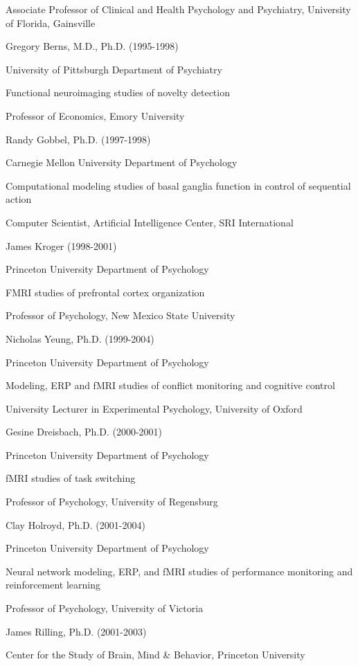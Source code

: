 \documentclass[10 pt]{article}
\begin{document}
Associate Professor of Clinical and Health Psychology and Psychiatry, University of Florida, Gainsville
    \medskip

Gregory Berns, M.D., Ph.D. (1995-1998)

University of Pittsburgh Department of Psychiatry

Functional neuroimaging studies of novelty detection

Professor of Economics, Emory University
    \medskip

Randy Gobbel, Ph.D. (1997-1998)

Carnegie Mellon University Department of Psychology

Computational modeling studies of basal ganglia function in control of sequential action

Computer Scientist, Artificial Intelligence Center, SRI International
    \medskip

James Kroger (1998-2001)

Princeton University Department of Psychology

FMRI studies of prefrontal cortex organization

Professor of Psychology, New Mexico State University
    \medskip

Nicholas Yeung, Ph.D. (1999-2004)

Princeton University Department of Psychology

Modeling, ERP and fMRI studies of conflict monitoring and cognitive control

University Lecturer in Experimental Psychology, University of Oxford
    \medskip

Gesine Dreisbach, Ph.D. (2000-2001)

Princeton University Department of Psychology

fMRI studies of task switching

Professor of Psychology, University of Regensburg
    \medskip

Clay Holroyd, Ph.D. (2001-2004)

Princeton University Department of Psychology

Neural network modeling, ERP, and fMRI studies of performance monitoring and reinforcement learning

Professor of Psychology, University of Victoria
    \medskip

James Rilling, Ph.D. (2001-2003)

Center for the Study of Brain, Mind \& Behavior, Princeton University
\end{document}
